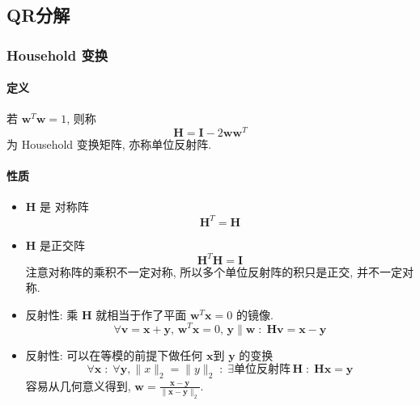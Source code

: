 \documentclass{ctexart}
\begin{document}
\subsection{QR分解}
\subsubsection{Household 变换}
\paragraph{定义}
    若 $ \mathbf{w}^T \mathbf{w} = 1$, 则称 \[
        \mathbf{H} = \mathbf{I} - 2 \mathbf{w} \mathbf{w}^T\]
    为 Household 变换矩阵, 亦称单位反射阵.
\paragraph{性质}
    \begin{itemize}
        \item $\mathbf{H} $ 是 对称阵\[
                \mathbf{H}^T = \mathbf{H}\]
        \item $\mathbf{H} $ 是正交阵 \[
                \mathbf{H}^T \mathbf{H} = \mathbf{I}\]
            注意对称阵的乘积不一定对称, 所以多个单位反射阵的积只是正交, 并不一定对称.
        \item 反射性: 乘 $\mathbf{H}$ 就相当于作了平面 $\mathbf{w}^T \mathbf{x} = 0$ 的镜像.\[
            \forall \mathbf{v} = \mathbf{x} + \mathbf{y},\,\mathbf{w}^T \mathbf{x} = 0,\, \mathbf{y} \parallel \mathbf{w}\;:\;
            \mathbf{H} \mathbf{v} = \mathbf{x} - \mathbf{y} \]
        \item 反射性: 可以在等模的前提下做任何 $\mathbf{x}$到 $\mathbf{y}$ 的变换 
            \[\forall \mathbf{x}\;:\;\forall \mathbf{y}, \|x\|_2=\|y\|_2\;:\;%
            \exists \text{单位反射阵} \,\mathbf{H} \;:\; \mathbf{H} \mathbf{x} = \mathbf{y}\]
            容易从几何意义得到, $\mathbf{w} = \frac{\mathbf{x} - \mathbf{y}}{\|\mathbf{x} - \mathbf{y}\|_2}$.
    \end{itemize}
\end{document}
